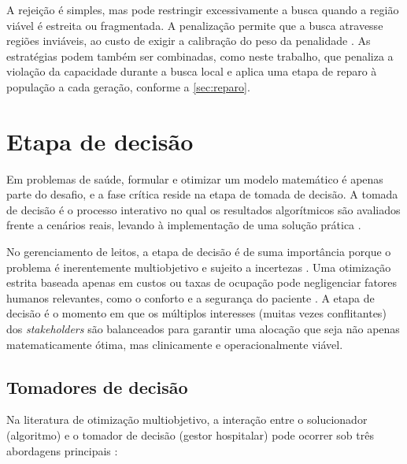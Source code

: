 A rejeição é simples, mas pode restringir excessivamente a busca quando a região viável é estreita ou fragmentada. A penalização permite que a busca atravesse regiões inviáveis, ao custo de exigir a calibração do peso da penalidade \cite{talbi2009metaheuristics}. As estratégias podem também ser combinadas, como neste trabalho, que penaliza a violação da capacidade durante a busca local e aplica uma etapa de reparo à população a cada geração, conforme a \autoref{sec:reparo}.


\section{Etapa de decisão}

Em problemas de saúde, formular e otimizar um modelo matemático é apenas parte do desafio, e a fase crítica reside na etapa de tomada de decisão. A tomada de decisão é o processo interativo no qual os resultados algorítmicos são avaliados frente a cenários reais, levando à implementação de uma solução prática \cite{talbi2009metaheuristics}.

No gerenciamento de leitos, a etapa de decisão é de suma importância porque o problema é inerentemente multiobjetivo e sujeito a incertezas \cite{schafer2023combining}. Uma otimização estrita baseada apenas em custos ou taxas de ocupação pode negligenciar fatores humanos relevantes, como o conforto e a segurança do paciente \cite{schafer2023combining}. A etapa de decisão é o momento em que os múltiplos interesses (muitas vezes conflitantes) dos \textit{stakeholders} são balanceados para garantir uma alocação que seja não apenas matematicamente ótima, mas clinicamente e operacionalmente viável.


\subsection{Tomadores de decisão}

Na literatura de otimização multiobjetivo, a interação entre o solucionador (algoritmo) e o tomador de decisão (gestor hospitalar) pode ocorrer sob três abordagens principais \cite{talbi2009metaheuristics}:

